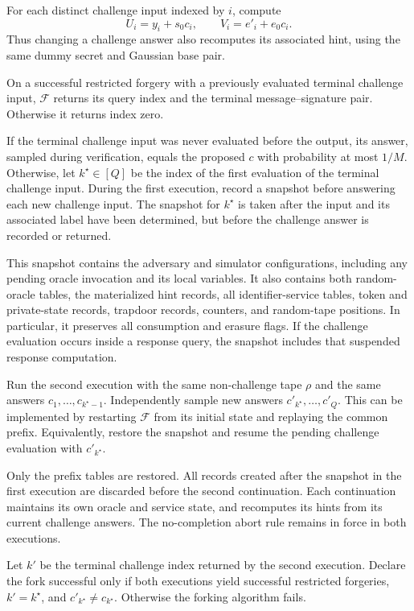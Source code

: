 \documentclass[lettersize,journal]{IEEEtran}
\begin{document}
For each distinct challenge input indexed by $i$, compute
\[
U_i=y_i+s_0c_i,\qquad V_i=e'_i+e_0c_i.
\]
Thus changing a challenge answer also recomputes its associated hint,
using the same dummy secret and Gaussian base pair.

On a successful restricted forgery with a previously evaluated
terminal challenge input, $\mathcal F$ returns its query index
and the terminal message--signature pair.
Otherwise it returns index zero.

If the terminal challenge input was never evaluated before the output,
its answer, sampled during verification, equals the proposed $c$ with
probability at most $1/M$. Otherwise, let $k^\star\in[Q]$ be the index of the first
evaluation of the terminal challenge input.
During the first execution, record a snapshot before answering
each new challenge input.
The snapshot for $k^\star$ is taken after the input and its
associated label have been determined, but before the challenge
answer is recorded or returned.

This snapshot contains the adversary and simulator configurations,
including any pending oracle invocation and its local variables.
It also contains both random-oracle tables, the materialized hint
records, all identifier-service tables, token and private-state
records, trapdoor records, counters, and random-tape positions.
In particular, it preserves all consumption and erasure flags.
If the challenge evaluation occurs inside a response query,
the snapshot includes that suspended response computation.

Run the second execution with the same non-challenge tape $\rho$
and the same answers $c_1,\ldots,c_{k^\star-1}$.
Independently sample new answers
$c'_{k^\star},\ldots,c'_Q$.
This can be implemented by restarting $\mathcal F$ from its initial
state and replaying the common prefix.
Equivalently, restore the snapshot and resume the pending challenge
evaluation with $c'_{k^\star}$.

Only the prefix tables are restored.
All records created after the snapshot in the first execution
are discarded before the second continuation.
Each continuation maintains its own oracle and service state,
and recomputes its hints from its current challenge answers.
The no-completion abort rule remains in force in both executions.

Let $k'$ be the terminal challenge index returned by the second
execution.
Declare the fork successful only if both executions yield successful
restricted forgeries, $k'=k^\star$, and
$c'_{k^\star}\ne c_{k^\star}$.
Otherwise the forking algorithm fails.
\end{document}
